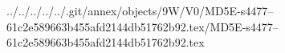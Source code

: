 ../../../../../.git/annex/objects/9W/V0/MD5E-s4477--61c2e589663b455afd2144db51762b92.tex/MD5E-s4477--61c2e589663b455afd2144db51762b92.tex